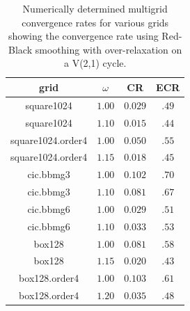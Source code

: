\documentclass{article}
\begin{document}
\begin{table}[hbt]
\begin{center}
\qquad %
\begin{tabular}{|c|c|c|c|} \hline 
 grid                 &  $\omega$ &   CR    & ECR  \\   \hline 
 square1024           &  $1.00$   & $0.029$ & $.49$ \\ 
 square1024           &  $1.10$   & $0.015$ & $.44$ \\ \hline
 square1024.order4    &  $1.00$   & $0.050$ & $.55$ \\ 
 square1024.order4    &  $1.15$   & $0.018$ & $.45$ \\ \hline
 cic.bbmg3            &  $1.00$   & $0.102$ & $.70$ \\ 
 cic.bbmg3            &  $1.10$   & $0.081$ & $.67$ \\ \hline
 cic.bbmg6            &  $1.00$   & $0.029$ & $.51$ \\ 
 cic.bbmg6            &  $1.10$   & $0.033$ & $.53$ \\ \hline
 box128               &  $1.00$   & $0.081$ & $.58$ \\ 
 box128               &  $1.15$   & $0.020$ & $.43$ \\ \hline
 box128.order4        &  $1.00$   & $0.103$ & $.61$ \\ 
 box128.order4        &  $1.20$   & $0.035$ & $.48$ \\ \hline
\end{tabular}
\end{center}
\caption{Numerically determined multigrid convergence rates for various grids showing the convergence rate using
    Red-Black smoothing with over-relaxation on a V(2,1) cycle.}
\label{tab:overRelaxtion} 
\end{table}
\end{document}
